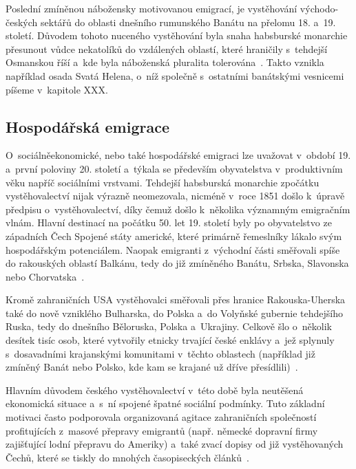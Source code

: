 Poslední zmíněnou nábožensky motivovanou emigrací, je vystěhování východo-českých sektářů do oblasti dnešního rumunského Banátu na přelomu 18. a~19. století. Důvodem tohoto nuceného vystěhování byla snaha habsburské monarchie přesunout vůdce nekatolíků do vzdálených oblastí, které hraničily s~tehdejší Osmanskou říší a~kde byla náboženská pluralita tolerována~\parencite{Nespor2005}. Takto vznikla například osada Svatá Helena, o~níž společně s~ostatními banátskými vesnicemi píšeme v~kapitole XXX.

\hypertarget{hospoduxe1ux159skuxe1-emigrace}{%
\subsection{Hospodářská emigrace}\label{hospoduxe1ux159skuxe1-emigrace}}

O~sociálněekonomické, nebo také hospodářské emigraci lze uvažovat v~období 19. a~první poloviny 20. století a~týkala se především obyvatelstva v~produktivním věku napříč sociálními vrstvami. Tehdejší habsburská monarchie zpočátku vystěhovalectví nijak výrazně neomezovala, nicméně v~roce 1851 došlo k~úpravě předpisu o~vystěhovalectví, díky čemuž došlo k~několika významným emigračním vlnám. Hlavní destinací na počátku 50. let 19. století byly po obyvatelstvo ze západních Čech Spojené státy americké, které primárně řemeslníky lákalo svým hospodářským potenciálem. Naopak emigranti z~východní části směřovali spíše do rakouských oblastí Balkánu, tedy do již zmíněného Banátu, Srbska, Slavonska nebo Chorvatska~\parencite{Vaculik2009b}.

Kromě zahraničních USA vystěhovalci směřovali přes hranice Rakouska-Uherska také do nově vzniklého Bulharska, do Polska a~do Volyňské gubernie tehdejšího Ruska, tedy do dnešního Běloruska, Polska a~Ukrajiny. Celkově šlo o~několik desítek tisíc osob, které vytvořily etnicky trvající české enklávy a~jež splynuly s~dosavadními krajanskými komunitami v~těchto oblastech (například již zmíněný Banát nebo Polsko, kde kam se krajané už dříve přesídlili)~\parencite{Nespor2005}.

Hlavním důvodem českého vystěhovalectví v~této době byla neutěšená ekonomická situace a~s~ní spojené špatné sociální podmínky. Tuto základní motivaci často podporovala organizovaná agitace zahraničních společností profitujících z~masové přepravy emigrantů (např. německé dopravní firmy zajišťující lodní přepravu do Ameriky) a~také zvací dopisy od již vystěhovaných Čechů, které se tiskly do mnohých časopiseckých článků~\parencite{Vaculik2009a}.


